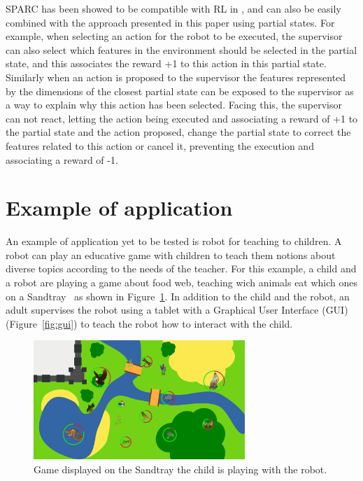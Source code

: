 \documentclass[letterpaper]{article} %
\begin{document}
SPARC has been showed to be compatible with RL in \cite{senft2017supervised},
and can also be easily combined with the approach presented in this paper using
partial states. For example, when selecting an action for the robot to be
executed, the supervisor can also select which features in the environment
should be selected in the partial state, and this associates the reward +1
to this action in this partial state. Similarly when an action is
proposed to the supervisor the features represented by the dimensions of the
closest partial state can be exposed to the supervisor as a way to explain why
this action has been selected. Facing this, the supervisor can not react,
letting the action being executed and associating a reward of +1 to the partial
state and the action proposed, change the partial state to correct the features
related to this action or cancel it, preventing the execution and associating a
reward of -1. 

\section{Example of application}

An example of application yet to be tested is robot for teaching to children.
A robot can play an educative game with children to teach them notions about
diverse topics according to the needs of the teacher. For this example, a child
and a robot are playing a game about food web, teaching wich animals eat which
ones on a Sandtray~\cite{baxter2012touchscreen} as shown in
Figure~\ref{fig:game}. In addition to the child and
the robot, an adult supervises the robot using a tablet with a Graphical User
Interface (GUI) (Figure~\ref{fig:gui}) to teach the robot how to interact with the child.
\begin{figure}
        \centering
  \includegraphics[width=80mm]{./fig/game.png} 
    \caption{Game displayed on the Sandtray the child is playing with the robot.}
        \label{fig:game}
\end{figure}
\end{document}
